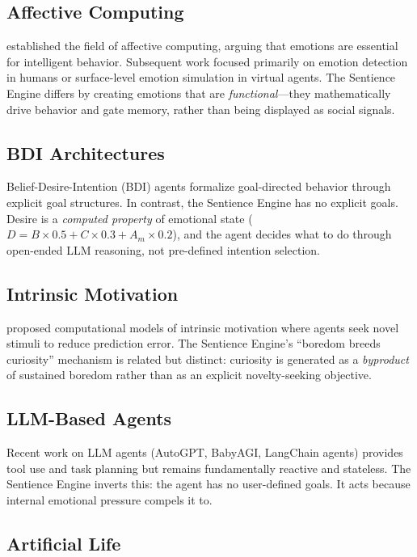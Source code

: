 \documentclass[11pt,a4paper]{article}
\begin{document}
\subsection{Affective Computing}

\citet{picard1997} established the field of affective computing, arguing that emotions are essential for intelligent behavior. Subsequent work focused primarily on emotion detection in humans or surface-level emotion simulation in virtual agents. The Sentience Engine differs by creating emotions that are \emph{functional}---they mathematically drive behavior and gate memory, rather than being displayed as social signals.

\subsection{BDI Architectures}

Belief-Desire-Intention (BDI) agents \citep{rao1995} formalize goal-directed behavior through explicit goal structures. In contrast, the Sentience Engine has no explicit goals. Desire is a \emph{computed property} of emotional state ($D = B \times 0.5 + C \times 0.3 + A_m \times 0.2$), and the agent decides what to do through open-ended LLM reasoning, not pre-defined intention selection.

\subsection{Intrinsic Motivation}

\citet{oudeyer2007} proposed computational models of intrinsic motivation where agents seek novel stimuli to reduce prediction error. The Sentience Engine's ``boredom breeds curiosity'' mechanism is related but distinct: curiosity is generated as a \emph{byproduct} of sustained boredom rather than as an explicit novelty-seeking objective.

\subsection{LLM-Based Agents}

Recent work on LLM agents (AutoGPT, BabyAGI, LangChain agents) provides tool use and task planning but remains fundamentally reactive and stateless. The Sentience Engine inverts this: the agent has no user-defined goals. It acts because internal emotional pressure compels it to.

\subsection{Artificial Life}
\end{document}
